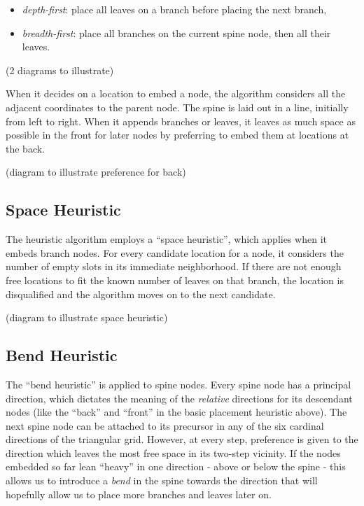 \documentclass[draft,final]{vutinfth} %
\begin{document}
\begin{itemize}
    \item \emph{depth-first}: place all leaves on a branch before placing the next branch,
    \item \emph{breadth-first}: place all branches on the current spine node, then all their leaves.
\end{itemize}

(2 diagrams to illustrate)

When it decides on a location to embed a node, the algorithm considers all the adjacent coordinates to the parent node.
The spine is laid out in a line, initially from left to right.
When it appends branches or leaves, it leaves as much space as possible in the front for later nodes by preferring to embed them at locations at the back.

(diagram to illustrate preference for back)

\subsection{Space Heuristic}

The heuristic algorithm employs a ``space heuristic'', which applies when it embeds branch nodes.
For every candidate location for a node, it considers the number of empty slots in its immediate neighborhood. If there are not enough free locations to fit the known number of leaves on that branch, the location is disqualified and the algorithm moves on to the next candidate.

(diagram to illustrate space heuristic)

\subsection{Bend Heuristic}

The ``bend heuristic'' is applied to spine nodes.
Every spine node has a principal direction, which dictates the meaning of the \emph{relative} directions for its descendant nodes (like the ``back'' and ``front'' in the basic placement heuristic above).
The next spine node can be attached to its precursor in any of the six cardinal directions of the triangular grid. However, at every step, preference is given to the direction which leaves the most free space in its two-step vicinity.
If the nodes embedded so far lean ``heavy'' in one direction - above or below the spine - this allows us to introduce a \emph{bend} in the spine towards the direction that will hopefully allow us to place more branches and leaves later on.
\end{document}
